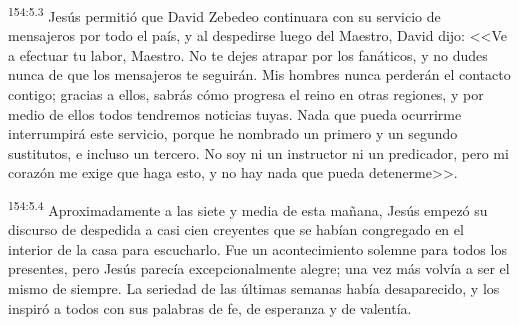 \par 
\textsuperscript{154:5.3} Jesús permitió que David Zebedeo continuara con su servicio de mensajeros por todo el país, y al despedirse luego del Maestro, David dijo: <<Ve a efectuar tu labor, Maestro. No te dejes atrapar por los fanáticos, y no dudes nunca de que los mensajeros te seguirán. Mis hombres nunca perderán el contacto contigo; gracias a ellos, sabrás cómo progresa el reino en otras regiones, y por medio de ellos todos tendremos noticias tuyas. Nada que pueda ocurrirme interrumpirá este servicio, porque he nombrado un primero y un segundo sustitutos, e incluso un tercero. No soy ni un instructor ni un predicador, pero mi corazón me exige que haga esto, y no hay nada que pueda detenerme>>.

\par 
\textsuperscript{154:5.4} Aproximadamente a las siete y media de esta mañana, Jesús empezó su discurso de despedida a casi cien creyentes que se habían congregado en el interior de la casa para escucharlo. Fue un acontecimiento solemne para todos los presentes, pero Jesús parecía excepcionalmente alegre; una vez más volvía a ser el mismo de siempre. La seriedad de las últimas semanas había desaparecido, y los inspiró a todos con sus palabras de fe, de esperanza y de valentía.

